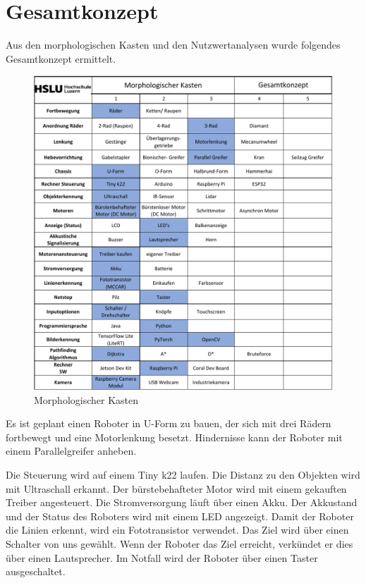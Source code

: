 \section{Gesamtkonzept}

Aus den morphologischen Kasten und den Nutzwertanalysen wurde folgendes Gesamtkonzept ermittelt. 

\begin{figure}[H]
\centering
\includegraphics[width=\textwidth -30mm]{assets/MK-all.pdf}
\caption{Morphologischer Kasten}
\label{fig:mk-all}
\end{figure}

Es ist geplant einen Roboter in U-Form zu bauen, der sich mit drei Rädern fortbewegt und eine Motorlenkung besetzt. Hindernisse kann der Roboter mit einem Parallelgreifer anheben.

Die Steuerung wird auf einem Tiny k22 laufen. Die Distanz zu den Objekten wird mit Ultraschall erkannt. Der bürstebehafteter Motor wird mit einem gekauften Treiber angesteuert. Die Stromversorgung läuft über einen Akku. Der Akkustand und der Status des Roboters wird mit einem LED angezeigt. Damit der Roboter die Linien erkennt, wird ein Fototransistor verwendet. Das Ziel wird über einen Schalter von uns gewählt.
Wenn der Roboter das Ziel erreicht, verkündet er dies über einen Lautsprecher. Im Notfall wird der Roboter über einen Taster ausgeschaltet.

